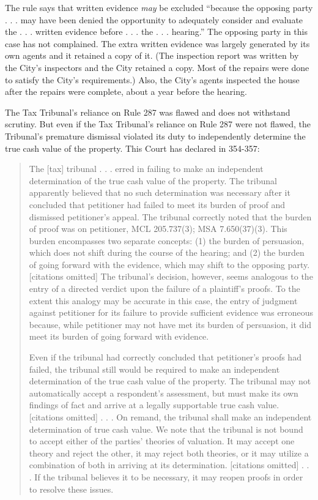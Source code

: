 \documentclass[12pt,\documentclassflag]{michiganCourtOfAppealsBrief}
\begin{document}
The rule says that written evidence \emph{may} be excluded ``because the opposing party . . . may have been denied the opportunity to adequately consider and evaluate the . . . written evidence before . . . the . . .  hearing.'' The opposing party in this case has not complained. The extra written evidence was largely generated by its own agents and it retained a copy of it. (The inspection report was written by the City's inspectors and the City retained a copy. Most of the repairs were done to satisfy the City's requirements.) Also, the City's agents inspected the house after the repairs were complete, about a year before the hearing.

The Tax Tribunal's reliance on Rule 287 was flawed and does not withstand scrutiny. But even if the Tax Tribunal's reliance on Rule 287 were not flawed, the Tribunal's premature dismissal violated its duty to independently determine the true cash value of the property. This Court has declared in \cite{Jones & Laughlin}{354-357}:

\begin{quote}
The [tax] tribunal . . . erred in failing to make an independent determination of the true cash value of the property. The tribunal apparently believed that no such determination was necessary after it concluded that petitioner had failed to meet its burden of proof and dismissed petitioner's appeal. The tribunal correctly noted that the burden of proof was on petitioner, MCL 205.737(3); MSA 7.650(37)(3). This burden encompasses two separate concepts: (1) the burden of persuasion, which does not shift during the course of the hearing; and (2) the burden of going forward with the evidence, which may shift to the opposing party. [citations omitted] The tribunal's decision, however, seems analogous to the entry of a directed verdict upon the failure of a plaintiff's proofs. To the extent this analogy may be accurate in this case, the entry of judgment against petitioner for its failure to provide sufficient evidence was erroneous because, while petitioner may not have met its burden of persuasion, it did meet its burden of going forward with evidence.

  Even if the tribunal had correctly concluded that petitioner's proofs had failed, the tribunal still would be required to make an independent determination of the true cash value of the property. The tribunal may not automatically accept a respondent's assessment, but must make its own findings of fact and arrive at a legally supportable true cash value. [citations omitted] . . . On remand, the tribunal shall make an independent determination of true cash value. We note that the tribunal is not bound to accept either of the parties' theories of valuation. It may accept one theory and reject the other, it may reject both theories, or it may utilize a combination of both in arriving at its determination. [citations omitted] . . . If the tribunal believes it to be necessary, it may reopen proofs in order to resolve these issues.
\end{quote}
\end{document}
